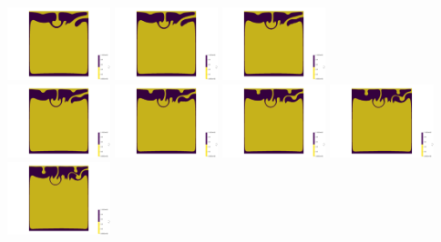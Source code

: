 \begin{itemize}
\begin{center}
\includegraphics[width=3cm]{images/benchmark_vaks97/aspect/lvl8/composition_threshold0012}
\includegraphics[width=3cm]{images/benchmark_vaks97/aspect/lvl8/composition_threshold0013}
\includegraphics[width=3cm]{images/benchmark_vaks97/aspect/lvl8/composition_threshold0014}\\
\includegraphics[width=3cm]{images/benchmark_vaks97/aspect/lvl8/composition_threshold0015}
\includegraphics[width=3cm]{images/benchmark_vaks97/aspect/lvl8/composition_threshold0016}
\includegraphics[width=3cm]{images/benchmark_vaks97/aspect/lvl8/composition_threshold0017}
\includegraphics[width=3cm]{images/benchmark_vaks97/aspect/lvl8/composition_threshold0018}
\includegraphics[width=3cm]{images/benchmark_vaks97/aspect/lvl8/composition_threshold0019}\\


\end{center}
\end{itemize}
